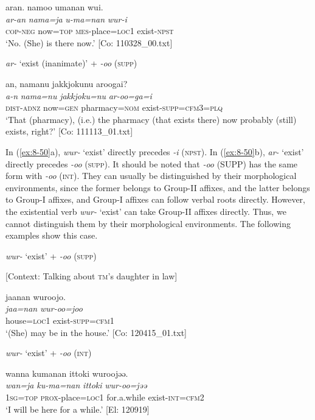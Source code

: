 {\TM}
\glll  aran.  namoo  umanan  wui.\\
\textit{ar-an}  \textit{nama=ja}  \textit{u-ma=nan}  \textit{wur-i}\\
\textsc{cop}-\textsc{neg}  now=\textsc{top}  \textsc{mes}-place=\textsc{loc1}  exist-\textsc{npst}\\
\glt ‘No. (She) is there now.’ [Co: 110328\_00.txt]

\ex \textit{ar-} ‘exist (inanimate)’ + \textit{-oo} (\textsc{supp})

{\TM}
\glll  an,  namanu  {\textbar}jakkjoku{\textbar}nu  aroogai?\\
\textit{a-n}  \textit{nama=nu}  \textit{jakkjoku=nu}  \textit{ar-oo=ga=i}\\
\textsc{dist}-\textsc{adnz}  now=\textsc{gen}  pharmacy=\textsc{nom}  exist-\textsc{supp}=\textsc{cfm3}=\textsc{plq}\\
\glt ‘That (pharmacy), (i.e.) the pharmacy (that exists there) now probably (still) exists, right?’ [Co: 111113\_01.txt]
\z
\z

In (\ref{ex:8-50}a), \textit{wur-} ‘exist’ directly precedes \textit{-i} (\textsc{npst}). In (\ref{ex:8-50}b), \textit{ar-} ‘exist’ directly precedes \textit{-oo} (\textsc{supp}). It should be noted that \textit{-oo} (SUPP) has the same form with \textit{-oo} (\textsc{int}). They can usually be distinguished by their morphological environments, since the former belongs to Group-II affixes, and the latter belongs to Group-I affixes, and Group-I affixes can follow verbal roots directly. However, the existential verb \textit{wur-} ‘exist’ can take Group-II affixes directly. Thus, we cannot distinguish them by their morphological environments. The following examples show this case.

\ea\label{ex:8-51}
\ea \textit{wur-} ‘exist’ + \textit{-oo} (\textsc{supp})

    [Context: Talking about \textsc{tm}’s daughter in law]

{\TM}
\glll  jaanan  wuroojo.\\
\textit{jaa=nan}  \textit{wur-oo=joo}\\
house=\textsc{loc1}  exist-\textsc{supp}=\textsc{cfm1}\\
\glt ‘(She) may be in the house.’ [Co: 120415\_01.txt]

\ex \textit{wur-} ‘exist’ + \textit{-oo} (\textsc{int})

{\TM}
\glll  wanna  kumanan  {\textbar}ittoki{\textbar}  wuroojəə.\\
\textit{wan=ja}  \textit{ku-ma=nan}  \textit{ittoki}  \textit{wur-oo=jəə}\\
1\textsc{sg}=\textsc{top}  \textsc{prox}-place=\textsc{loc1}  for.a.while  exist-\textsc{int}=\textsc{cfm2}\\
\glt ‘I will be here for a while.’ [El: 120919]
\z
\z

